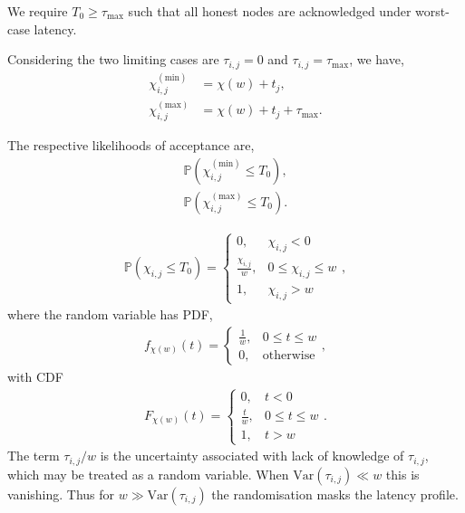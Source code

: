 We require $T_0\geq\tau_\mathrm{max}$ such that all honest nodes are acknowledged under worst-case latency.

Considering the two limiting cases are $\tau_{i,j}=0$ and $\tau_{i,j}=\tau_\mathrm{max}$, we have,
\begin{align}
	\chi_{i,j}^{(\mathrm{min})} & = \chi(w) + t_j,\nonumber            \\
	\chi_{i,j}^{(\mathrm{max})} & = \chi(w) + t_j + \tau_\mathrm{max}.
\end{align}

The respective likelihoods of acceptance are,
\begin{align}
	\mathbb{P}(\chi_{i,j}^{(\mathrm{min})} \leq T_0),\nonumber \\
	\mathbb{P}(\chi_{i,j}^{(\mathrm{max})} \leq T_0).
\end{align}

\begin{align}
	\mathbb{P}(\chi_{i,j} \leq T_0) = \begin{cases}
		                                  0,                    & \chi_{i,j}<0           \\
		                                  \frac{\chi_{i,j}}{w}, & 0\leq \chi_{i,j}\leq w \\
		                                  1,                    & \chi_{i,j}>w
	                                  \end{cases},
\end{align}
where the random variable has PDF,
\begin{align}
	f_{\chi(w)}(t) = \begin{cases}
		                 \frac{1}{w}, & 0\leq t\leq w      \\
		                 0,           & \mathrm{otherwise}
	                 \end{cases},
\end{align}
with CDF
\begin{align}
	F_{\chi(w)}(t) = \begin{cases}
		                 0,           & t<0           \\
		                 \frac{t}{w}, & 0\leq t\leq w \\
		                 1,           & t>w
	                 \end{cases}.
\end{align}
The term \mbox{$\tau_{i,j}/w$} is the uncertainty associated with lack of knowledge of $\tau_{i,j}$, which may be treated as a random variable. When \mbox{$\mathrm{Var}(\tau_{i,j})\ll w$} this is vanishing. Thus for \mbox{$w\gg \mathrm{Var}(\tau_{i,j})$} the randomisation masks the latency profile.

